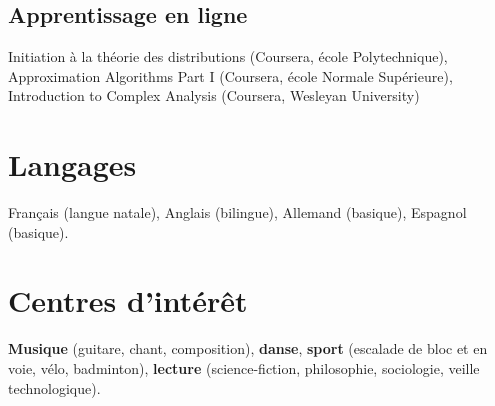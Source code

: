 \documentclass[11pt,a4paper,sans]{moderncv} %
\renewcommand*{\cvitem}[3][.25em]{%
\ifthenelse{\equal{#2}{}}{}{\hintstyle{#2} }{#3}%
\par\addvspace{#1}}
\begin{document}
\subsection{ Apprentissage en ligne}
Initiation à la théorie des distributions (Coursera, école Polytechnique),
Approximation Algorithms Part I (Coursera, école Normale Supérieure),
Introduction to Complex Analysis (Coursera, Wesleyan University)



\section{ Langages}
Français (langue natale), Anglais (bilingue), Allemand (basique), Espagnol (basique).


\section{ Centres d'intérêt}
\textbf{Musique} (guitare, chant, composition),
\textbf{danse},
\textbf{sport} (escalade de bloc et en voie, vélo, badminton),
\textbf{lecture} (science-fiction, philosophie, sociologie, veille technologique).

\end{document}

